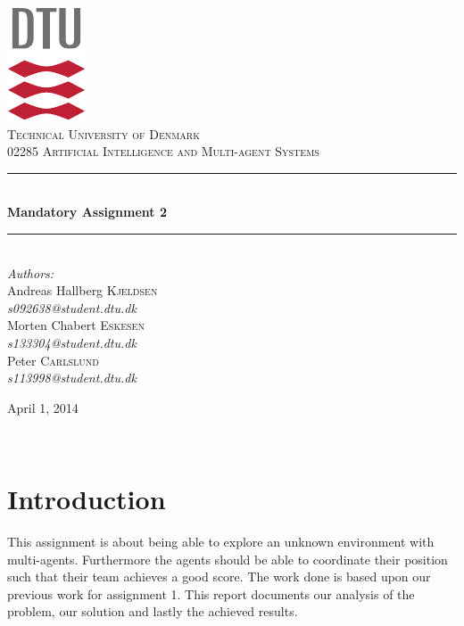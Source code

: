 \documentclass[11pt]{report}
\newcommand{\HRule}{\rule{\linewidth}{0.5mm}}
\begin{document}
\begin{titlepage}
\begin{center}

\includegraphics[scale=2.0]{../GFX/dtu_logo.pdf}\\[1cm]

\textsc{\LARGE Technical University of Denmark}\\[1.5cm]

\textsc{\Large 02285 Artificial Intelligence and Multi-agent Systems}\\[0.5cm]

\HRule \\[0.4cm]
{\huge \bfseries Mandatory Assignment 2}\\[0.1cm]
\HRule \\[1.5cm]

\large
\emph{Authors:}
\\[10pt]
Andreas Hallberg \textsc{Kjeldsen}\\
\emph{s092638@student.dtu.dk}
\\[10pt]
Morten Chabert \textsc{Eskesen}\\
\emph{s133304@student.dtu.dk}
\\[10pt]
Peter \textsc{Carlslund}\\
\emph{s113998@student.dtu.dk}

\vfill

{\large April 1, 2014}

\end{center}
\end{titlepage}

${}$
\section*{Introduction}
This assignment is about being able to explore an unknown environment with multi-agents. Furthermore the agents should be able to coordinate their position such that their team achieves a good score. The work done is based upon our previous work for assignment 1. This report documents our analysis of the problem, our solution and lastly the achieved results.
\end{document}
